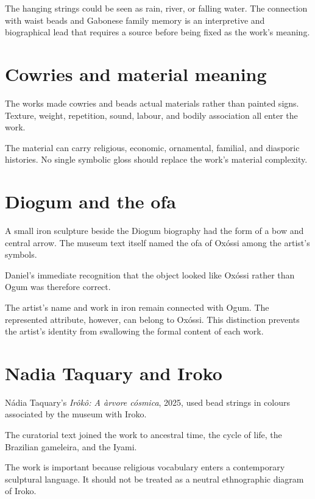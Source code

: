 The hanging strings could be seen as rain,
river, or falling water.  The connection
with waist beads and Gabonese family
memory is an interpretive and biographical
lead that requires a source before being
fixed as the work's meaning.

\section{Cowries and material meaning}
\label{section-art-cowries}

The works made cowries and beads actual
materials rather than painted signs.
Texture, weight, repetition, sound, labour,
and bodily association all enter the work.

The material can carry religious, economic,
ornamental, familial, and diasporic
histories.  No single symbolic gloss should
replace the work's material complexity.

\section{Diogum and the ofa}
\label{section-art-diogum}

A small iron sculpture beside the Diogum
biography had the form of a bow and central
arrow.  The museum text itself named the
ofa of Ox\'ossi among the artist's symbols.

Daniel's immediate recognition that the
object looked like Ox\'ossi rather than
Ogum was therefore correct.

The artist's name and work in iron remain
connected with Ogum.  The represented
attribute, however, can belong to Ox\'ossi.
This distinction prevents the artist's
identity from swallowing the formal content
of each work.

\section{Nadia Taquary and Iroko}
\label{section-art-nadia-iroko}

N\'adia Taquary's
\emph{Ir\^ok\^o: A \`arvore c\'osmica},
2025, used bead strings in colours
associated by the museum with Iroko.

The curatorial text joined the work to
ancestral time, the cycle of life, the
Brazilian gameleira, and the Iyami.

The work is important because religious
vocabulary enters a contemporary sculptural
language.  It should not be treated as a
neutral ethnographic diagram of Iroko.

